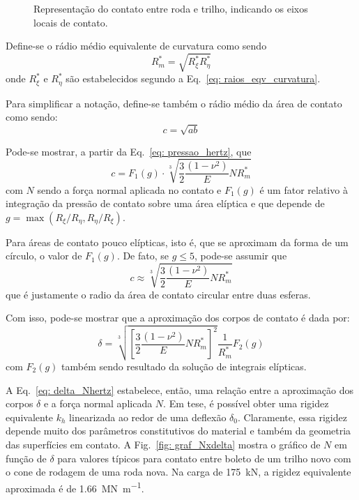 \begin{figure}
\centering
    
    \caption{Representação do contato entre roda e trilho, indicando os eixos locais de contato.}
    \label{fig: hertz_roda_trilho}
\end{figure}

Define-se o rádio médio equivalente de curvatura como sendo
\begin{equation}
    R_m^* = \sqrt{R_\xi^* R_\eta^*}
\end{equation}
onde $R_\xi^*$ e $R_\eta^*$ são estabelecidos segundo a Eq.~\eqref{eq: raios_eqv_curvatura}.

Para simplificar a notação, define-se também o rádio médio da área de contato como sendo:
\begin{equation}
    c = \sqrt{ab}
\end{equation}

Pode-se mostrar, a partir da Eq.~\eqref{eq: pressao_hertz}, que 
\begin{equation}
    c = F_1(g)\cdot\sqrt[3]{\frac{3}{2}\frac{\left(1-\nu^2\right)}{E} N R_m^*}
\end{equation}
com $N$ sendo a força normal aplicada no contato e $F_1(g)$ é um fator relativo à integração da pressão
de contato sobre uma área elíptica e que depende de $g = \max\left(R_\xi/R_\eta,R_\eta/R_\xi\right)$.

Para áreas de contato pouco elípticas, isto é, que se aproximam da forma de um círculo, o valor de $F_1(g)$. 
De fato, se $g\leq5$, pode-se assumir que \cite{singer_introduction_1992}
\begin{equation}
    c \approx \sqrt[3]{\frac{3}{2} \frac{\left(1-\nu^2\right)}{E}N R_m^*}
\end{equation}
que é justamente o radio da área de contato circular entre duas esferas.

Com isso, pode-se mostrar que \cite[cap. 4]{johnson_contact_1985} a aproximação dos corpos de contato é dada por:
\begin{equation}
    \delta = \sqrt[3]{\left[ \frac{3}{2} \frac{\left(1-\nu^2\right)}{E} N R_m^* \right]^2} \frac{1}{R_m^*} F_2(g)
    \label{eq: delta_Nhertz}
\end{equation}
com $F_2(g)$ também sendo resultado da solução de integrais elípticas.

A Eq.~\eqref{eq: delta_Nhertz} estabelece, então, uma relação entre a aproximação dos corpos $\delta$ e a força normal
aplicada $N$. Em tese, é possível obter uma rigidez equivalente $k_h$ linearizada ao redor de uma deflexão $\delta_0$.
Claramente, essa rigidez depende muito dos parâmetros constitutivos do material e também da geometria das superfícies
em contato. A Fig.~\ref{fig: graf_Nxdelta} mostra o gráfico de $N$ em função de $\delta$ para valores típicos para
contato entre boleto de um trilho novo com o cone de rodagem de uma roda nova. Na carga de \SI{175}{\kilo\newton},
a rigidez equivalente aproximada é de \SI{1,66}{\mega\newton\per\m}.

